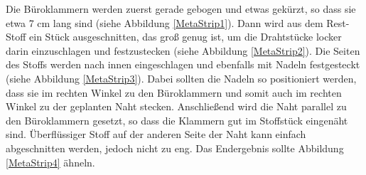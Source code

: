 \documentclass[12pt,parskip=full]{scrartcl}
\begin{document}
Die Büroklammern werden zuerst gerade gebogen und etwas gekürzt, so dass sie etwa 7 cm lang sind (siehe Abbildung \ref{MetaStrip1}). Dann wird aus dem Rest-Stoff ein Stück ausgeschnitten, das groß genug ist, um die Drahtstücke locker darin einzuschlagen und festzustecken (siehe Abbildung \ref{MetaStrip2}). Die Seiten des Stoffs werden nach innen eingeschlagen und ebenfalls mit Nadeln festgesteckt (siehe Abbildung \ref{MetaStrip3}). Dabei sollten die Nadeln so positioniert werden, dass sie im rechten Winkel zu den Büroklammern und somit auch im rechten Winkel zu der geplanten Naht stecken. Anschließend wird die Naht parallel zu den Büroklammern gesetzt, so dass die Klammern gut im Stoffstück eingenäht sind. Überflüssiger Stoff auf der anderen Seite der Naht kann einfach abgeschnitten werden, jedoch nicht zu eng. Das Endergebnis sollte Abbildung \ref{MetaStrip4} ähneln.
\end{document}
